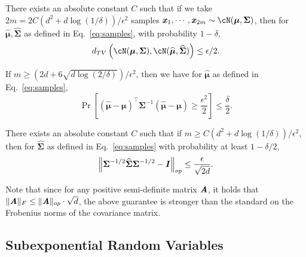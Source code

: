 \begin{lemma}
    There exists an absolute constant $C$ such that if we take $2m = 2C(d^2+d\log(1/\delta))/\epsilon^2$ samples $\xx_1,\cdots,\xx_{2m}\sim \cN(\boldsymbol{\mu},\boldsymbol{\Sigma})$, then for $  \widehat{\boldsymbol{\mu}}, \widehat{\boldsymbol{\Sigma}}$ as defined in Eq.~\eqref{eq:samples}, with probability $1-\delta$,
\[
d_{TV}\left(\cN(\boldsymbol{\mu},\boldsymbol{\Sigma}),\cN(\widehat{\boldsymbol{\mu}},\widehat{\boldsymbol{\Sigma}})\right) \leq \epsilon/2.
    \]
\end{lemma}



\begin{lemma}\label{lem:MeanGauss}
    If $m\geq (2d + 6\sqrt{d\log(2/\delta)})/\epsilon^2$, then we have for $\widehat{\boldsymbol{\mu}}$ as defined in Eq.~\eqref{eq:samples},
    \[
    \Pr\left[(\widehat{\boldsymbol{\mu}}-\boldsymbol{\mu})^{\top}\boldsymbol{\Sigma}^{-1}(\widehat{\boldsymbol{\mu}}-\boldsymbol{\mu}) \geq \frac{\epsilon^2}{2}\right] \leq \frac{\delta}{2}.
    \]
\end{lemma}

\begin{lemma}\label{lem:CovGauss}
    There exists an absolute constant $C$ such that if $m \geq C(d^2+d\log(1/\delta))/\epsilon^2$, then for $  \widehat{\boldsymbol{\Sigma}}$ as defined in Eq.~\eqref{eq:samples} with probability at least $1-\delta/2$,
    \[
\left\|\boldsymbol{\Sigma}^{-1/2}\widehat{\boldsymbol{\Sigma}}\boldsymbol{\Sigma}^{-1/2} -\II\right\|_{op}\leq \frac{\epsilon}{\sqrt{2d}}.
    \]
\end{lemma}

Note that since for any positive semi-definite matrix $\AA$, it holds that $\|\AA\|_F\leq \|\AA\|_{op}\cdot \sqrt{d}$, the above guarantee is stronger than the standard on the Frobenius norms of the covariance matrix.


\subsection*{Subexponential Random Variables}

